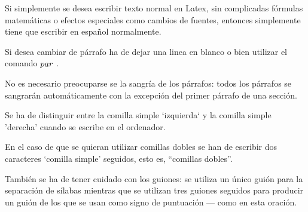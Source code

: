 \documentclass[a4paper,10pt]{letter}
\begin{document}
Si simplemente se desea escribir texto normal en Latex,
sin complicadas f\'ormulas matem\'aticas o efectos especiales
como cambios de fuentes, entonces simplemente tiene que escribir
en espa\~nol normalmente.\par
Si desea cambiar de párrafo ha de dejar una linea en blanco o bien
utilizar el comando $\\par$ .

No es necesario preocuparse se la sangría de los párrafos:
todos los párrafos se sangrarán automáticamente con la excepción
del primer párrafo de una sección.

Se ha de distinguir entre la comilla simple `izquierda`
y la comilla simple 'derecha' cuando se escribe en el ordenador.

En el caso de que se quieran utilizar comillas dobles se han de 
escribir dos caracteres `comilla simple' seguidos, esto es, 
``comillas dobles''.

También se ha de tener cuidado con los guiones: se utiliza un único
guión para la separación de sílabas mientras que se utilizan
tres guiones seguidos para producir un guión de los que se usan
como signo de puntuación --- como en esta oración.
\end{document}
